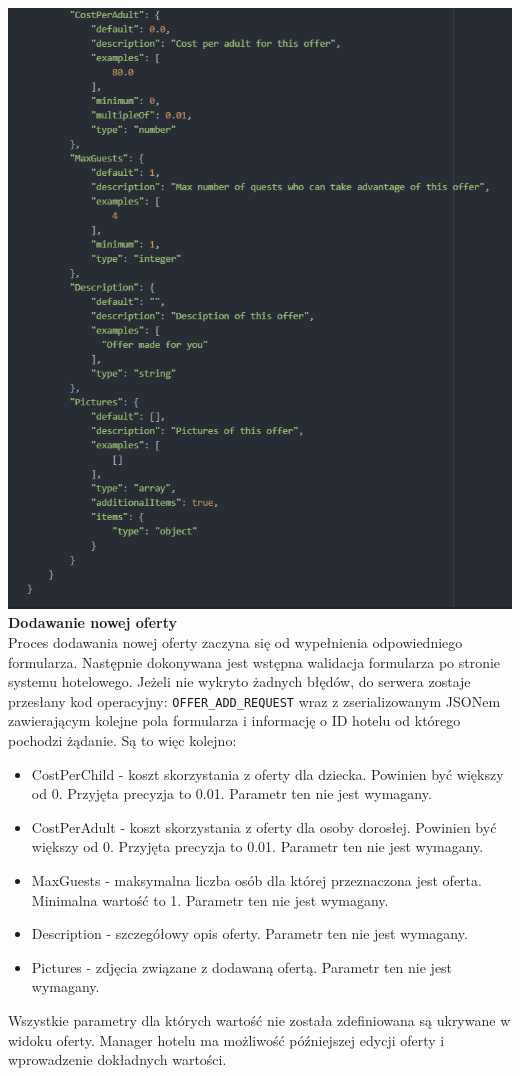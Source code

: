 \documentclass{article}
\begin{document}
\includegraphics[width=\linewidth]{Oferta-Hotel-Serwer/Offer_Add_JSON2.png}
\textbf{Dodawanie nowej oferty}\\
Proces dodawania nowej oferty zaczyna się od wypełnienia odpowiedniego formularza. Następnie dokonywana jest wstępna walidacja formularza po stronie systemu hotelowego. Jeżeli nie wykryto żadnych błędów, do serwera zostaje przesłany kod operacyjny: \texttt{OFFER\_ADD\_REQUEST} wraz z zserializowanym JSONem zawierającym kolejne pola formularza i informację o ID hotelu od którego pochodzi żądanie. Są to więc kolejno:
\begin{itemize}
    \item CostPerChild - koszt skorzystania z oferty dla dziecka. Powinien być większy od 0. Przyjęta precyzja to 0.01. Parametr ten nie jest wymagany.
    \item CostPerAdult - koszt skorzystania z oferty dla osoby dorosłej. Powinien być większy od 0. Przyjęta precyzja to 0.01. Parametr ten nie jest wymagany.
    \item MaxGuests - maksymalna liczba osób dla której przeznaczona jest oferta. Minimalna wartość to 1. Parametr ten nie jest wymagany.
    \item Description - szczegółowy opis oferty. Parametr ten nie jest wymagany.
    \item Pictures - zdjęcia związane z dodawaną ofertą. Parametr ten nie jest wymagany.
\end{itemize}
Wszystkie parametry dla których wartość nie została zdefiniowana są ukrywane w widoku oferty. Manager hotelu ma możliwość późniejszej edycji oferty i wprowadzenie dokładnych wartości.
\end{document}
